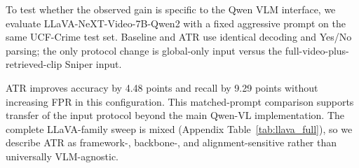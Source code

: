 To test whether the observed gain is specific to the Qwen VLM interface, we evaluate LLaVA-NeXT-Video-7B-Qwen2 with a fixed aggressive prompt on the same UCF-Crime test set. Baseline and ATR use identical decoding and Yes/No parsing; the only protocol change is global-only input versus the full-video-plus-retrieved-clip Sniper input.

\begin{table}[t]
  \centering
  \caption{Cross-backbone check with LLaVA-NeXT-Video-7B-Qwen2 on UCF-Crime ($N$=290), using the same aggressive prompt for both methods.}
  \label{tab:llava_validation}
\end{table}

ATR improves accuracy by 4.48 points and recall by 9.29 points without increasing FPR in this configuration. This matched-prompt comparison supports transfer of the input protocol beyond the main Qwen-VL implementation. The complete LLaVA-family sweep is mixed (Appendix Table~\ref{tab:llava_full}), so we describe ATR as framework-, backbone-, and alignment-sensitive rather than universally VLM-agnostic.
